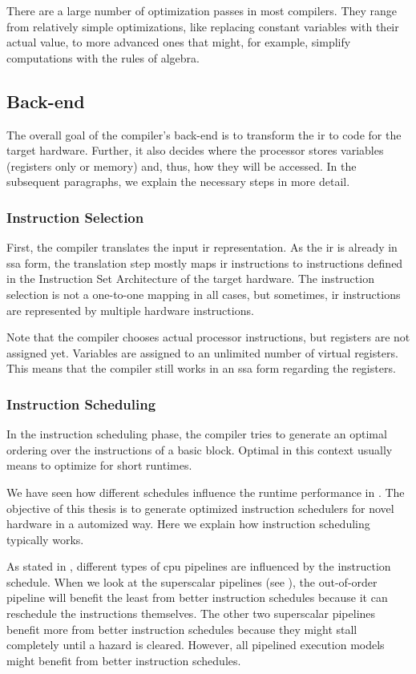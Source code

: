 There are a large number of optimization passes in most compilers.
They range from relatively simple optimizations, like replacing constant variables with their actual value, to more advanced ones that might, for example, simplify computations with the rules of algebra.

\subsection{Back-end}
\label{sec:bg:compilers:backend}
The overall goal of the compiler's back-end is to transform the \ac{ir} to code for the target hardware.
Further, it also decides where the processor stores variables (registers only or memory) and, thus, how they will be accessed.
In the subsequent paragraphs, we explain the necessary steps in more detail.

\subsubsection{Instruction Selection}
First, the compiler translates the input \ac{ir} representation.
As the \ac{ir} is already in \ac{ssa} form, the translation step mostly maps \ac{ir} instructions to instructions defined in the Instruction Set Architecture of the target hardware.
The instruction selection is not a one-to-one mapping in all cases, but sometimes, \ac{ir} instructions are represented by multiple hardware instructions.

Note that the compiler chooses actual processor instructions, but registers are not assigned yet.
Variables are assigned to an unlimited number of virtual registers.
This means that the compiler still works in an \ac{ssa} form regarding the registers.

\subsubsection{Instruction Scheduling}
In the instruction scheduling phase, the compiler tries to generate an optimal ordering over the instructions of a basic block.
Optimal in this context usually means to optimize for short runtimes.

We have seen how different schedules influence the runtime performance in .
The objective of this thesis is to generate optimized instruction schedulers for novel hardware in a automized way.
Here we explain how instruction scheduling typically works.

As stated in , different types of \ac{cpu} pipelines are influenced by the instruction schedule.
When we look at the superscalar pipelines (see ), the out-of-order pipeline will benefit the least from better instruction schedules because it can reschedule the instructions themselves.
The other two superscalar pipelines benefit more from better instruction schedules because they might stall completely until a hazard is cleared.
However, all pipelined execution models might benefit from better instruction schedules.

